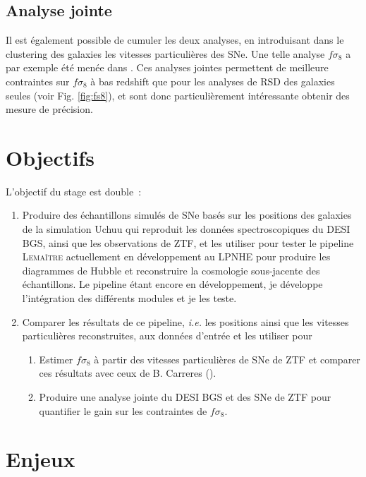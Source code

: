 \documentclass{book}
\def\lemaitre{\textsc{Lemaître}\xspace}
\begin{document}
\subsection{Analyse jointe }

Il est également possible de cumuler les deux analyses, en introduisant dans le clustering des galaxies les vitesses particulières des SNe. Une telle analyse $f\sigma_8$ a par exemple été menée dans \cite{boruah_bayesian_2022, stahl_peculiar-velocity_2021}. Ces analyses jointes permettent de meilleure contraintes sur $f\sigma_8$ à bas redshift que pour les analyses de RSD des galaxies seules (voir Fig. \ref{fig:fs8}), et sont donc particulièrement intéressante obtenir des mesure de précision.

\section{Objectifs}

L'objectif du stage est double~:
\begin{enumerate}
    \item Produire des échantillons simulés de SNe basés sur les positions des galaxies de la simulation Uchuu qui reproduit les données spectroscopiques du DESI BGS, ainsi que les observations de ZTF, et les utiliser pour tester le pipeline \lemaitre actuellement en développement au LPNHE pour produire les diagrammes de Hubble et reconstruire la cosmologie sous-jacente des échantillons. Le pipeline étant encore en développement, je développe l'intégration des différents modules et je les teste.
    \item Comparer les résultats de ce pipeline, \textit{i.e.} les positions ainsi que les vitesses particulières reconstruites, aux données d'entrée et les utiliser pour
    	\begin{enumerate}
		\item Estimer $f \sigma_8$ à partir des vitesses particulières de SNe de ZTF et comparer ces résultats avec ceux de B. Carreres (\cite{carreres_growth-rate_2023}).
		\item Produire une analyse jointe du DESI BGS et des SNe de ZTF pour quantifier le gain sur les contraintes de $f\sigma_8$.
	\end{enumerate}
\end{enumerate}

\section{Enjeux}
\end{document}
